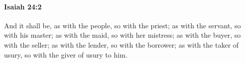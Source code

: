 
		\paragraph{Isaiah 24:2} %
			\label{ISAIAH-24-2}

			And it shall be, as with the people, so with the priest; as with the servant, so with his master; as with the maid, so with her mistress; as with the buyer, so with the seller; as with the lender, so with the borrower; as with the taker of usury, so with the giver of usury to him.


